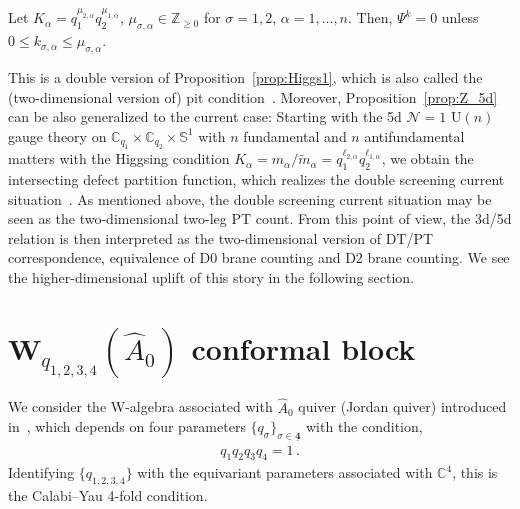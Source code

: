 \begin{proposition}\label{prop:Higgs2}
Let $K_\alpha = q_1^{\mu_{2,\alpha}} q_2^{\mu_{1,\alpha}}$, $\mu_{\sigma,\alpha} \in \mathbb{Z}_{\ge 0}$ for $\sigma=1,2$, $\alpha = 1,\ldots,n$.
Then, $\Psi^{\underline{k}} = 0$ unless $0 \le k_{\sigma,\alpha} \le \mu_{\sigma,\alpha}$.
\end{proposition}
This is a double version of Proposition~\ref{prop:Higgs1}, which is also called the (two-dimensional version of) pit condition~\cite{Bershtein:2018SM}.
Moreover, Proposition~\ref{prop:Z_5d} can be also generalized to the current case:
Starting with the 5d $\mathcal{N}=1$ $\mathrm{U}(n)$ gauge theory on $\mathbb{C}_{q_1} \times \mathbb{C}_{q_2} \times \mathbb{S}^1$ with $n$ fundamental and $n$ antifundamental matters with the Higgsing condition $K_\alpha = m_\alpha/\widetilde{m}_\alpha = q_1^{\ell_{2,\alpha}} q_2^{\ell_{1,\alpha}}$, we obtain the intersecting defect partition function, which realizes the double screening current situation~\cite{Dimofte:2010tz,Bonelli:2011fq,Gomis:2016ljm,Pan:2016fbl,Gorsky:2017hro,Nieri:2017ntx,Kimura:2021ngu}.
As mentioned above, the double screening current situation may be seen as the two-dimensional two-leg PT count.
From this point of view, the 3d/5d relation is then interpreted as the two-dimensional version of DT/PT correspondence, equivalence of D0 brane counting and D2 brane counting.
We see the higher-dimensional uplift of this story in the following section.


\section{W$_{q_{1,2,3,4}}(\widehat{A}_0)$ conformal block}

We consider the W-algebra associated with $\widehat{A}_0$ quiver (Jordan quiver) introduced in~\cite{Kimura:2015rgi}, which depends on four parameters $\{ q_\sigma \}_{\sigma \in \underline{\mathbf{4}}}$ with the condition,
\begin{align}
 q_1 q_2 q_3 q_4 = 1 \, .
 \label{eq:CY4_cond}
\end{align}
Identifying $\{q_{1,2,3,4}\}$ with the equivariant parameters associated with $\mathbb{C}^4$, this is the Calabi--Yau 4-fold condition.

